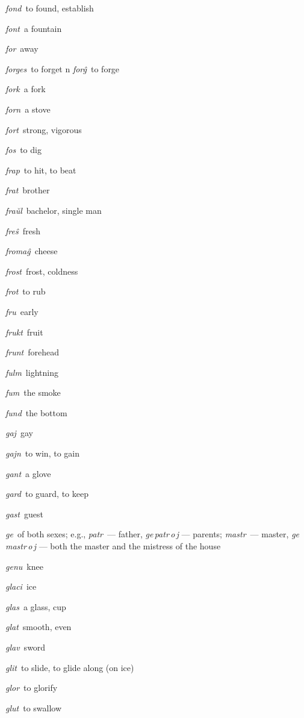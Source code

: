 \begin{landscape}
\begin{multicols}{5}
\begin{outdent}{1em}
\emph{fond\,} to found, establish

\emph{font\,} a fountain

\emph{for\,} away

\emph{forges\,} to forget
n
\emph{forĝ\,} to forge

\emph{fork\,} a fork

\emph{forn\,} a stove

\emph{fort\,} strong, vigorous

\emph{fos\,} to dig

\emph{frap\,} to hit, to beat

\emph{frat\,} brother

\emph{fraŭl\,} bachelor, single man

\emph{freŝ\,} fresh

\emph{fromaĝ\,} cheese

\emph{frost\,} frost, coldness

\emph{frot\,} to rub

\emph{fru\,} early

\emph{frukt\,} fruit

\emph{frunt\,} forehead

\emph{fulm\,} lightning

\emph{fum\,} the smoke

\emph{fund\,} the bottom
\end{outdent}


\begin{outdent}{1em}
\emph{gaj\,} gay

\emph{gajn\,} to win, to gain

\emph{gant\,} a glove

\emph{gard\,} to guard, to keep

\emph{gast\,} guest

\emph{ge\,} of both sexes; e.g., \emph{patr\,} — father, \emph{ge\,patr\,o\,j} — parents; \emph{mastr\,} — master, \emph{ge\,mastr\,o\,j} — both the master and the mistress of the house

\emph{genu\,} knee

\emph{glaci\,} ice

\emph{glas\,} a glass, cup

\emph{glat\,} smooth, even

\emph{glav\,} sword

\emph{glit\,} to slide, to glide along (on ice)

\emph{glor\,} to glorify

\emph{glut\,} to swallow


\end{outdent}
\end{multicols}
\end{landscape}
